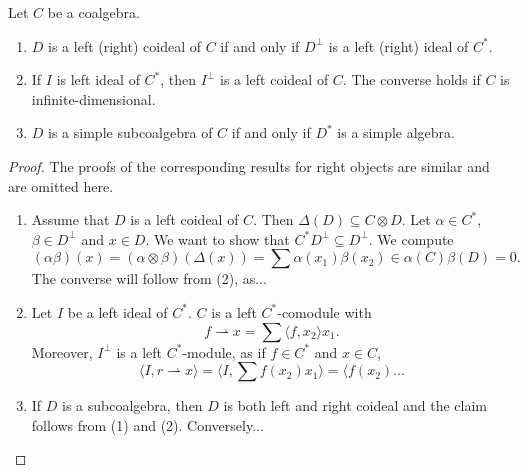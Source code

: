 \documentclass[12pt]{amsproc}
\begin{document}
\begin{lemma}
\label{lem:correspondence}
    Let $C$ be a coalgebra. 
    \begin{enumerate}
        \item $D$ is a left (right) coideal of $C$ 
        if and only if $D^\perp$ is a left  (right)
        ideal of $C^*$. 
        \item If $I$ is left ideal of $C^*$, then 
        $I^\perp$ is a left coideal of $C$. The converse holds if $C$ is infinite-dimensional.
        \item $D$ is a simple subcoalgebra of $C$ 
        if and only if $D^*$ is a simple algebra. 
    \end{enumerate}
\end{lemma}

\begin{proof}
    The proofs of the corresponding results for right objects are similar and are omitted here.
    \begin{enumerate}
        \item Assume that $D$ is a left coideal of $C$. Then  
        $\Delta(D)\subseteq C\otimes D$. Let $\alpha\in C^*$, $\beta\in D^\perp$ and $x\in D$. We want to show that
        $C^*D^\perp\subseteq D^\perp$. We compute 
        \[
        (\alpha\beta)(x)=(\alpha\otimes\beta)(\Delta(x))
        =\sum\alpha(x_1)\beta(x_2)\in \alpha(C)\beta(D)=0.
        \]
        The converse will follow from (2), as... 

        \item Let $I$ be a left ideal of $C^*$. 
        $C$ is a left $C^*$-comodule with 
        \[
        f\rightharpoonup x=\sum\langle f,x_2\rangle x_1.
        \]
        Moreover, $I^\perp$ is a left $C^*$-module, as 
        if $f\in C^*$ and $x\in C$, 
        \[
        \langle I,r\rightharpoonup x\rangle
        =\langle I,\sum f(x_2)x_1\rangle 
        =\langle f(x_2)...
        \]
        \item If $D$ is a subcoalgebra, then $D$ is both left and right coideal and the claim follows from (1) and (2). Conversely...
    \end{enumerate}
\end{proof}
\end{document}
